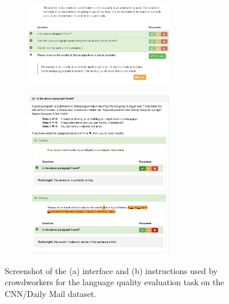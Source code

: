 \begin{figure}
  \begin{subfigure}{\textwidth}
    \centering
    \includegraphics[width=0.7\textwidth]{figures/edit}
    \caption{\label{fig:lqual-interface}}
  \end{subfigure}
  \begin{subfigure}{\textwidth}
    \centering
    \includegraphics[width=0.7\textwidth]{figures/lqual_tutorial}
    \caption{\label{fig:lqual-tutorial}}
  \end{subfigure}
  \caption{\label{fig:interfaces-edit} Screenshot of the (a) interface and (b) instructions used by crowdworkers for the language quality evaluation task on the CNN/Daily Mail dataset.}
\end{figure}

